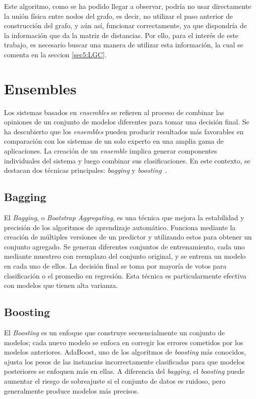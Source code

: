 Este algoritmo, como se ha podido llegar a observar, podría no usar directamente la unión física entre nodos del grafo, es decir, no utilizar el paso anterior de construcción del grafo, y aún así, funcionar correctamente, ya que dispondría de la información que da la matriz de distancias. Por ello, para el interés de este trabajo, es necesario buscar una manera de utilizar esta información, la cual se comenta en la seccion \ref{sec5:LGC}.
\clearpage
\section{Ensembles}
Los sistemas basados en \textit{ensembles} se refieren al proceso de combinar las opiniones de un conjunto de modelos diferentes para tomar una decisión final. Se ha descubierto que los \textit{ensembles} pueden producir resultados más favorables en comparación con los sistemas de un solo experto en una amplia gama de aplicaciones. La creación de un \textit{ensemble} implica generar componentes individuales del sistema y luego combinar sus clasificaciones. En este contexto, se destacan dos técnicas principales: \textit{bagging} y \textit{boosting}~\cite{ensembles}.

\subsection{Bagging}
El \textit{Bagging}, o \textit{Bootstrap Aggregating}, es una técnica que mejora la estabilidad y precisión de los algoritmos de aprendizaje automático. Funciona mediante la creación de múltiples versiones de un predictor y utilizando estos para obtener un conjunto agregado. Se generan diferentes conjuntos de entrenamiento, cada uno mediante muestreo con reemplazo del conjunto original, y se entrena un modelo en cada uno de ellos. La decisión final se toma por mayoría de votos para clasificación o el promedio en regresión. Esta técnica es particularmente efectiva con modelos que tienen alta varianza.

\subsection{Boosting}
El \textit{Boosting} es un enfoque que construye secuencialmente un conjunto de modelos; cada nuevo modelo se enfoca en corregir los errores cometidos por los modelos anteriores. AdaBoost, uno de los algoritmos de \textit{boosting} más conocidos, ajusta los pesos de las instancias incorrectamente clasificadas para que modelos posteriores se enfoquen más en ellas. A diferencia del \textit{bagging}, el \textit{boosting} puede aumentar el riesgo de sobreajuste si el conjunto de datos es ruidoso, pero generalmente produce modelos más precisos.


